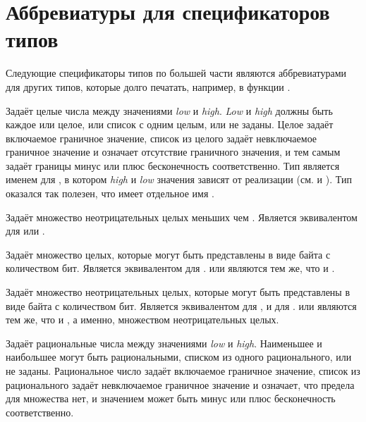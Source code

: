 \section{Аббревиатуры для спецификаторов типов}

Следующие спецификаторы типов по большей части являются аббревиатурами для других
типов, которые долго печатать, например, в функции .
\begin{flushdesc}

\item[\cd{(integer \emph{low} \emph{high})}]
  Задаёт целые числа между значениями \emph{low} и
  \emph{high}. \emph{Low} и \emph{high} должны быть
  каждое или целое, или список с одним целым, или не заданы.
  Целое задаёт включаемое граничное значение, список из целого задаёт невключаемое
  граничное значение и \cdf{*} означает отсутствие граничного значения, и тем самым
  задаёт границы минус или плюс бесконечность соответственно.
  Тип  является именем для , в котором \emph{high} и \emph{low}
  значения зависят от реализации (см.  и
  ).
  Тип  оказался так полезен, что имеет отдельное имя .

\item[\cd{(mod \emph{n})}]
  Задаёт множество неотрицательных целых меньших чем . Является эквивалентом
  для  или .

\item[\cd{(signed-byte \emph{s})}]
  Задаёт множество целых, которые могут быть представлены в виде байта с 
  количеством бит. Является эквивалентом для .
   или  являются тем же, что и .

\item[\cd{(unsigned-byte \emph{s})}]
  Задаёт множество неотрицательных целых, которые могут быть представлены в виде байта с 
  количеством бит. Является эквивалентом для , и для .
   или  являются тем же, что и
  , а именно, множеством неотрицательных целых.

\item[\cd{(rational \emph{low} \emph{high})}]
  Задаёт рациональные числа между значениями \emph{low} и
  \emph{high}. Наименьшее и наибольшее могут быть рациональными, списком
  из одного рационального, или не заданы.
  Рациональное число задаёт включаемое граничное значение, список из
  рационального задаёт невключаемое граничное значение и \cdf{*} означает, что
  предела для множества нет, и значением может быть минус или плюс бесконечность соответственно.


\end{flushdesc}
